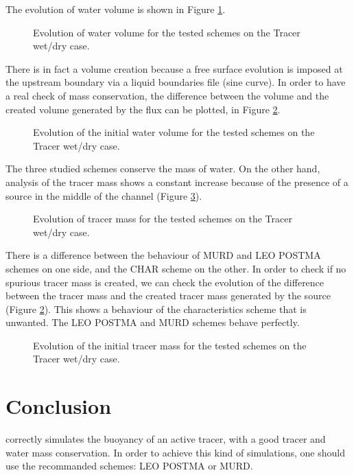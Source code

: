 The evolution of water volume is shown in Figure \ref{fig:tracerwetdry:VoLTime}.

\begin{figure}[H]
\centering
  \caption{Evolution of water volume for the tested schemes on the Tracer wet/dry case.}
\label{fig:tracerwetdry:VoLTime}
\end{figure}

There is in fact a volume creation because a free surface evolution is imposed at the upstream
boundary via a liquid boundaries file (sine curve). In order to have a real check of
mass conservation, the difference between the volume and the created volume
generated by the flux can be plotted, in Figure \ref{fig:tracerwetdry:ConservedVoLTime}.

\begin{figure}[H]
\centering
  \caption{Evolution of the initial water volume for the tested schemes on the Tracer wet/dry case.}
\label{fig:tracerwetdry:ConservedVoLTime}
\end{figure}

The three studied schemes conserve the mass of water.
On the other hand, analysis of the tracer mass shows a constant increase
because of the presence of a source in the middle of the channel (Figure \ref{fig:tracerwetdry:TracerMassTime}).

\begin{figure}[H]
\centering
  \caption{Evolution of tracer mass for the tested schemes on the Tracer wet/dry case.}
\label{fig:tracerwetdry:TracerMassTime}
\end{figure}

There is a difference between the behaviour of MURD and LEO POSTMA schemes on one side,
and the CHAR scheme on the other. In order to check if no spurious tracer mass is created,
we can check the evolution of the difference between the tracer mass and the created tracer
mass generated by the source (Figure \ref{fig:tracerwetdry:ConservedVoLTime}).
This shows a behaviour of the characteristics scheme that is unwanted. The LEO POSTMA and MURD schemes behave perfectly.

\begin{figure}[H]
\centering
  \caption{Evolution of the initial tracer mass for the tested schemes on the Tracer wet/dry case.}
\label{fig:tracerwetdry:ConservedTracerMassTime}
\end{figure}

\section{Conclusion}

 correctly simulates the buoyancy of an active tracer, with a good tracer and
water mass conservation. In order to achieve this kind of simulations, one should use
the recommanded schemes: LEO POSTMA or MURD.
